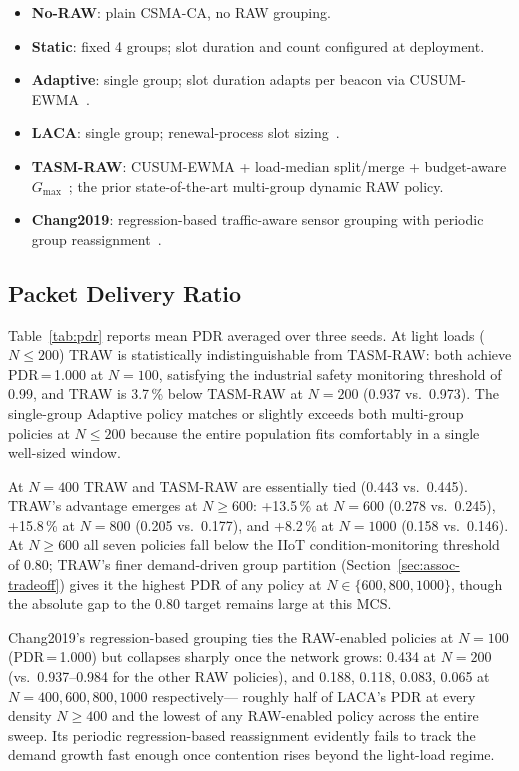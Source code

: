 \documentclass[journal]{IEEEtran}
\begin{document}
\begin{itemize}
  \item \textbf{No-RAW}: plain CSMA-CA, no RAW grouping.
  \item \textbf{Static}: fixed 4 groups; slot duration and count
        configured at deployment.
  \item \textbf{Adaptive}: single group; slot duration adapts per
        beacon via CUSUM-EWMA~\cite{kalita2025}.
  \item \textbf{LACA}: single group; renewal-process slot
        sizing~\cite{taramit2023}.
  \item \textbf{TASM-RAW}: CUSUM-EWMA + load-median split/merge
        + budget-aware $G_\mathrm{max}$~\cite{kalita2025b};
        the prior state-of-the-art multi-group dynamic RAW policy.
  \item \textbf{Chang2019}: regression-based traffic-aware sensor
        grouping with periodic group reassignment~\cite{chang2019}.
\end{itemize}

\subsection{Packet Delivery Ratio}

Table~\ref{tab:pdr} reports mean PDR averaged over three seeds.
At light loads ($N\!\leq\!200$) TRAW is statistically indistinguishable
from TASM-RAW: both achieve PDR\,=\,1.000 at $N\!=\!100$, satisfying the
industrial safety monitoring threshold of 0.99, and TRAW is 3.7\,\%
below TASM-RAW at $N\!=\!200$ (0.937 vs.\ 0.973).
The single-group Adaptive policy matches or slightly exceeds both
multi-group policies at $N\!\leq\!200$ because the entire population
fits comfortably in a single well-sized window.

At $N\!=\!400$ TRAW and TASM-RAW are essentially tied (0.443 vs.\ 0.445).
TRAW's advantage emerges at $N\!\geq\!600$: +13.5\,\% at $N\!=\!600$
(0.278 vs.\ 0.245), +15.8\,\% at $N\!=\!800$ (0.205 vs.\ 0.177), and
+8.2\,\% at $N\!=\!1000$ (0.158 vs.\ 0.146).
At $N\!\geq\!600$ all seven policies fall below the IIoT
condition-monitoring threshold of 0.80; TRAW's finer demand-driven
group partition (Section~\ref{sec:assoc-tradeoff}) gives it the highest PDR
of any policy at $N\!\in\!\{600,800,1000\}$, though the absolute gap to
the 0.80 target remains large at this MCS.

Chang2019's regression-based grouping ties the RAW-enabled policies at
$N\!=\!100$ (PDR\,=\,1.000) but collapses sharply once the network grows:
0.434 at $N\!=\!200$ (vs.\ 0.937--0.984 for the other RAW policies),
and 0.188, 0.118, 0.083, 0.065 at $N\!=\!400,600,800,1000$ respectively---
roughly half of LACA's PDR at every density $N\!\geq\!400$ and the lowest
of any RAW-enabled policy across the entire sweep. Its periodic
regression-based reassignment evidently fails to track the
demand growth fast enough once contention rises beyond the
light-load regime.
\end{document}
